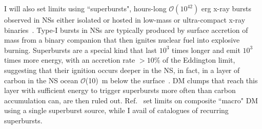 \documentclass[
    twocolumn,
	prd,
        amssymb,
	preprintnumbers,
	secnumarabic,
	nofootinbib,
	superscriptaddress]{revtex4-1}
\begin{document}
I will also set limits using ``superbursts", hours-long $\mathcal{O}(10^{42})$ erg x-ray bursts observed in NSs either isolated or hosted in low-mass or ultra-compact x-ray binaries~\cite{supburst:MINBARcatalog:2020,supburst:catalog2023}.
Type-I bursts in NSs are typically produced by surface accretion of mass from a binary companion that then ignites nuclear fuel into explosive burning. 
Superbursts are a special kind that last $10^3$ times longer and emit $10^3$ times more energy, with an accretion rate $> 10\%$ of the Eddington limit,  
suggesting that their ignition occurs deeper in the NS, in fact, in a layer of carbon in the NS ocean $\mathcal{O}$(10)~m below the surface~\cite{supburst:Cflashes:Cumming:2001wg,supburst:underZanding:2017ugu}.
DM clumps that reach this layer with sufficient energy to trigger superbursts more often than carbon accumulation can, are then ruled out.
Ref.~\cite{MACROSidhu2020} set limits on composite ``macro" DM using a single superburst source, while I avail of catalogues of recurring superbursts.
\end{document}
